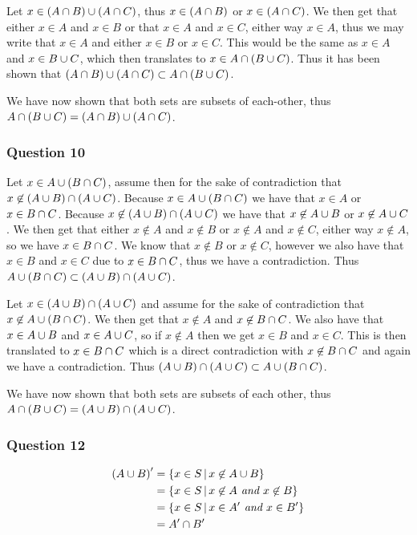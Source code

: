 \documentclass{article}
\begin{document}
Let $x \in (A\cap B) \cup (A\cap C)$, thus $x \in (A\cap B)$ or $x\in (A\cap C)$. We then get that either $x \in A$ and $x \in B$ or that $x\in A$ and $x\in C$, either way $x\in A$, thus we may write that $x \in A$ and either $x\in B$ or $x\in C$. This would be the same as $x\in A$ and $x\in B\cup C$, which then translates to $x \in A \cap (B\cup C)$. Thus it has been shown that $(A\cap B)\cup (A\cap C) \subset A\cap (B\cup C)$.

We have now shown that both sets are subsets of each-other, thus $A\cap(B\cup C) = (A\cap B)\cup (A\cap C)$.

\subsubsection{Question 10}

Let $x\in A\cup (B\cap C)$, assume then for the sake of contradiction that $x\not\in(A\cup B)\cap (A\cup C)$. Because $x \in A\cup (B\cap C)$ we have that $x \in A$ or $x\in B\cap C$. Because $x\not\in (A\cup B)\cap (A\cup C)$ we have that $x\not\in A\cup B$ or $x\not\in A\cup C$. We then get that either $x \not\in A$ and $x\not\in B$ or $x\not\in A$ and $x\not\in C$, either way $x\not\in A$, so we have $x\in B\cap C$. We know that $x\not\in B$ or $x\not\in C$, however we also have that $x\in B$ and $x\in C$ due to $x\in B\cap C$, thus we have a contradiction. Thus $A\cup(B\cap C) \subset (A\cup B)\cap(A \cup C)$.

Let $x\in (A \cup B) \cap (A\cup C)$ and assume for the sake of contradiction that $x\not\in A\cup(B \cap C)$. We then get that $x\not\in A$ and $x\not\in B\cap C$. We also have that $x\in A \cup B$ and $x\in A \cup C$, so if $x\not\in A$ then we get $x\in B$ and $x\in C$. This is then translated to $x\in B\cap C$ which is a direct contradiction with $x\not\in B\cap C$ and again we have a contradiction. Thus $(A\cup B)\cap(A\cup C)\subset A\cup (B\cap C)$.

We have now shown that both sets are subsets of each other, thus $A\cap(B\cup C) = (A\cup B)\cap(A\cup C)$.

\subsubsection{Question 12}

\begin{align*}
	{(A\cup B)}' &= \left\{{x\in S} \,\middle|\, {x\not\in A\cup B}\right\} \\
	&= \left\{{x\in S} \,\middle|\, {x\not\in A \textit{ and } x\not\in B}\right\} \\
	&= \left\{{x\in S} \,\middle|\, {x \in {A}' \textit{ and } x\in {B}'}\right\} \\
	&= {A}' \cap {B}'
\end{align*}
\end{document}
